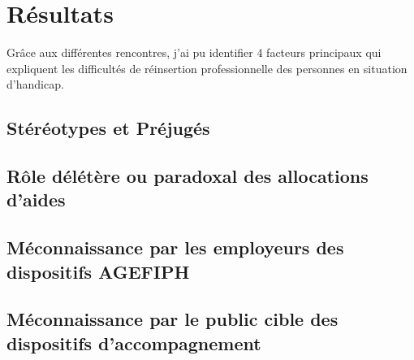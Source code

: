 \chapter{Résultats}

Grâce aux différentes rencontres, j'ai pu identifier 4 facteurs principaux qui expliquent les difficultés de réinsertion professionnelle des personnes en situation d'handicap.

\section{Stéréotypes et Préjugés}

\section{R\^ole délétère ou paradoxal des allocations d'aides}

\section{Méconnaissance par les employeurs des dispositifs AGEFIPH}

\section{Méconnaissance par le public cible des dispositifs d'accompagnement}